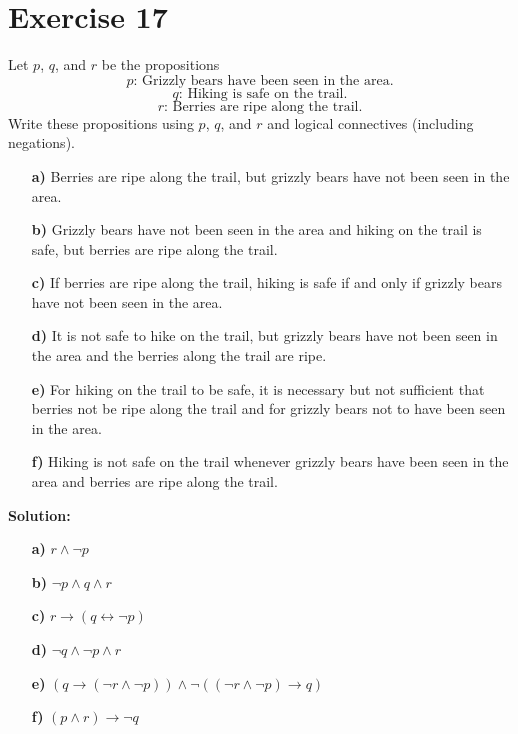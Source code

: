 \documentclass{Axon}
\begin{document}
\section*{Exercise 17}
Let \(p\), \(q\), and \(r\) be the propositions
\begin{equation}
    p\text{: Grizzly bears have been seen in the area.}
\end{equation}
\begin{equation}
    q\text{: Hiking is safe on the trail.}
\end{equation}
\begin{equation}
    r\text{: Berries are ripe along the trail.}
\end{equation}
Write these propositions using \(p\), \(q\), and \(r\) and logical connectives (including negations).
\begin{enumerate}
    \item[\textbf{a)}] Berries are ripe along the trail, but grizzly bears have not been seen in the area.
    \item[\textbf{b)}] Grizzly bears have not been seen in the area and hiking on the trail is safe, but berries are ripe along the trail.
    \item[\textbf{c)}] If berries are ripe along the trail, hiking is safe if and only if grizzly bears have not been seen in the area.
    \item[\textbf{d)}] It is not safe to hike on the trail, but grizzly bears have not been seen in the area and the berries along the trail are ripe.
    \item[\textbf{e)}] For hiking on the trail to be safe, it is necessary but not sufficient that berries not be ripe along the trail and for grizzly bears not to have been seen in the area.
    \item[\textbf{f)}] Hiking is not safe on the trail whenever grizzly bears have been seen in the area and berries are ripe along the trail.
\end{enumerate}

\noindent
\textbf{Solution:}
\begin{enumerate}
    \item[\textbf{a)}] \(r \land \lnot p\)
    \item[\textbf{b)}] \(\lnot p \land q \land r\)
    \item[\textbf{c)}] \(r \to (q \leftrightarrow \lnot p)\)
    \item[\textbf{d)}] \(\lnot q \land \lnot p \land r\)
    \item[\textbf{e)}] \((q \to (\lnot r \land \lnot p)) \land \lnot((\lnot r \land \lnot p) \to q)\)
    \item[\textbf{f)}] \((p \land r) \to \lnot q\)
\end{enumerate}
\end{document}
